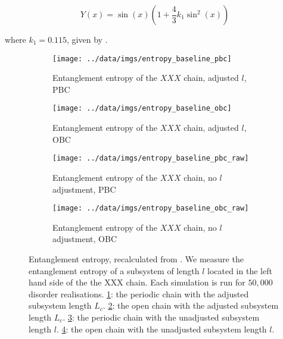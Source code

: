 \begin{equation}
Y(x)=\sin (x)\left(1+\frac{4}{3} k_{1} \sin ^{2}(x)\right)
\end{equation}

where $k_1 = 0.115$, given by \cite{fagotti_2011}. 

\begin{figure}
     \centering
     \begin{subfigure}[b]{0.49\textwidth}
    \centering
  \texttt{[image: ../data/imgs/entropy\_baseline\_pbc]}
    \caption{Entanglement entropy of the $XXX$ chain, adjusted $l$, PBC}
    \label{fig:baseline_entropy_pbc}
\end{subfigure}
     \hfill
     \begin{subfigure}[b]{0.49\textwidth}
         \centering
    \texttt{[image: ../data/imgs/entropy\_baseline\_obc]}
    \caption{Entanglement entropy of the $XXX$ chain, adjusted $l$, OBC}
    \label{fig:baseline_entropy_obc}
     \end{subfigure}
  	\begin{subfigure}[b]{0.49\textwidth}
    \centering
  \texttt{[image: ../data/imgs/entropy\_baseline\_pbc\_raw]}
    \caption{Entanglement entropy of the $XXX$ chain, no $l$ adjustment, PBC}
    \label{fig:baseline_entropy_pbc_raw}
\end{subfigure}
\hfill
\begin{subfigure}[b]{0.49\textwidth}
    \centering
  \texttt{[image: ../data/imgs/entropy\_baseline\_obc\_raw]}
    \caption{Entanglement entropy of the $XXX$ chain, no $l$ adjustment, OBC}
    \label{fig:baseline_entropy_obc_raw}
\end{subfigure}
     \caption{Entanglement entropy, recalculated from \cite{paola2016}. We measure the entanglement entropy of a subsystem of length $l$ located in the left hand side of the the XXX chain. Each simulation is run for $50,000$ disorder realisations. \ref{fig:baseline_entropy_pbc}: the periodic chain with the adjusted subsystem length $L_c$. \ref{fig:baseline_entropy_obc}: the open chain with the adjusted subsystem length $L_c$. \ref{fig:baseline_entropy_pbc_raw}: the periodic chain with the unadjusted subsystem length $l$. \ref{fig:baseline_entropy_obc_raw}: the open chain with the unadjusted subsystem length $l$.}
        \label{fig:baseline_entanglement}
\end{figure}


